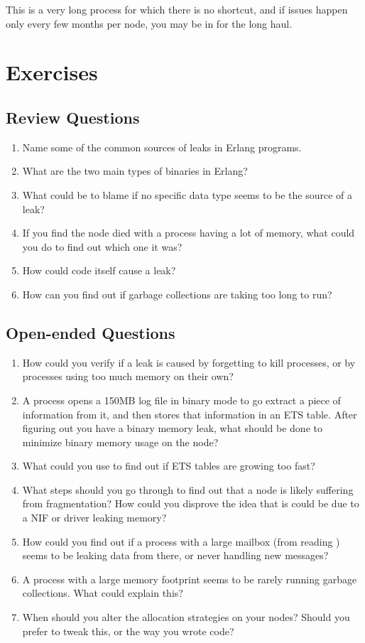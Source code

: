 \documentclass[11pt, oneside]{book}   	%
\begin{document}
This is a very long process for which there is no shortcut, and if issues happen only every few months per node, you may be in for the long haul. 


\section{Exercises}

\subsection*{Review Questions}

\begin{enumerate}
	\item Name some of the common sources of leaks in Erlang programs.
	\item What are the two main types of binaries in Erlang?
	\item What could be to blame if no specific data type seems to be the source of a leak?
	\item If you find the node died with a process having a lot of memory, what could you do to find out which one it was?
	\item How could code itself cause a leak?
	\item How can you find out if garbage collections are taking too long to run?
\end{enumerate}

\subsection*{Open-ended Questions}

\begin{enumerate}
	\item  How could you verify if a leak is caused by forgetting to kill processes, or by processes using too much memory on their own?
	\item A process opens a 150MB log file in binary mode to go extract a piece of information from it, and then stores that information in an ETS table. After figuring out you have a binary memory leak, what should be done to minimize binary memory usage on the node?
	\item What could you use to find out if ETS tables are growing too fast?
	\item What steps should you go through to find out that a node is likely suffering from fragmentation? How could you disprove the idea that is could be due to a NIF or driver leaking memory?
	\item How could you find out if a process with a large mailbox (from reading ) seems to be leaking data from there, or never handling new messages?
	\item A process with a large memory footprint seems to be rarely running garbage collections. What could explain this?
	\item When should you alter the allocation strategies on your nodes? Should you prefer to tweak this, or the way you wrote code?
\end{enumerate}
\end{document}
